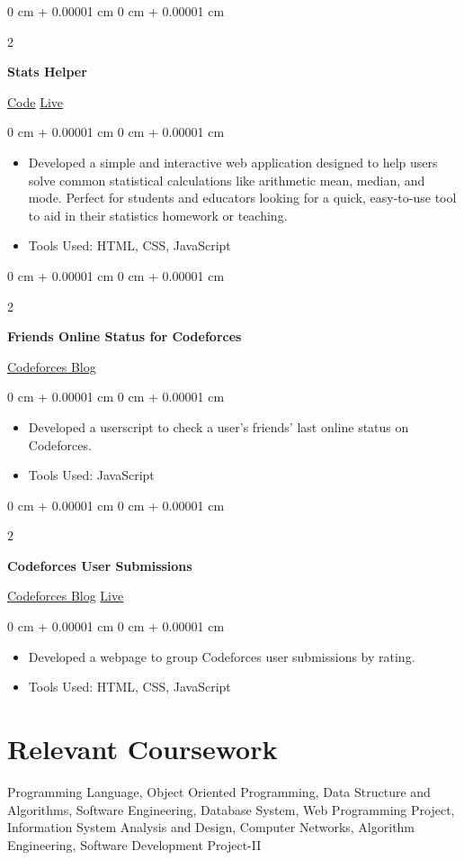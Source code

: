 \documentclass[10pt, letterpaper]{article}
\newenvironment{highlights}{
    \begin{itemize}[
        topsep=0.10 cm,
        parsep=0.10 cm,
        partopsep=0pt,
        itemsep=0pt,
        leftmargin=0 cm + 10pt
    ]
}{
    \end{itemize}
} %
\newenvironment{onecolentry}{
    \begin{adjustwidth}{
        0 cm + 0.00001 cm
    }{
        0 cm + 0.00001 cm
    }
}{
    \end{adjustwidth}
} %
\newenvironment{twocolentry}[2][]{
    \onecolentry
    \def\secondColumn{#2}
    \setcolumnwidth{\fill, 4.5 cm}
    \begin{paracol}{2}
}{
    \switchcolumn \raggedleft \secondColumn
    \end{paracol}
    \endonecolentry
} %
\begin{document}
\begin{twocolentry}{
		\href{https://github.com/itstheavro/stats-helper/}{Code} \AND  \href{https://itstheavro.github.io/stats-helper/}{Live}
	}
	\textbf{Stats Helper}
\end{twocolentry}
\vspace{0.10 cm}
\begin{onecolentry}
	\begin{highlights}
		\item Developed a simple and interactive web application designed to help users solve common statistical calculations like arithmetic mean, median, and mode. Perfect for students and educators looking for a quick, easy-to-use tool to aid in their statistics homework or teaching.
		\item Tools Used: HTML, CSS, JavaScript
	\end{highlights}
\end{onecolentry}
\vspace{0.2 cm}

\begin{twocolentry}{
		\href{https://codeforces.com/blog/entry/110724}{Codeforces Blog}
	}
	\textbf{Friends Online Status for Codeforces}
\end{twocolentry}
\vspace{0.10 cm}
\begin{onecolentry}
	\begin{highlights}
		\item Developed a userscript to check a user's friends' last online status on Codeforces.
		\item Tools Used: JavaScript
	\end{highlights}
\end{onecolentry}
\vspace{0.2 cm}

\begin{twocolentry}{
		\href{https://codeforces.com/blog/entry/111609}{Codeforces Blog} \AND \href{https://cfusersubmissions.vercel.app/}{Live}
	}
	\textbf{Codeforces User Submissions}
\end{twocolentry}
\vspace{0.10 cm}
\begin{onecolentry}
	\begin{highlights}
		\item Developed a webpage to group Codeforces user submissions by rating.
		\item Tools Used: HTML, CSS, JavaScript
	\end{highlights}
\end{onecolentry}
\vspace{0.2 cm}

\section{Relevant Coursework}
Programming Language, Object Oriented Programming, Data Structure and Algorithms, Software Engineering, Database System, Web Programming Project, Information System Analysis and Design, Computer Networks, Algorithm Engineering, Software Development Project-II
\end{document}
